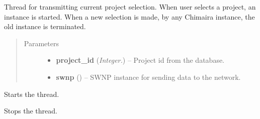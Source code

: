 \documentclass[letterpaper,10pt,english]{sphinxmanual}
\begin{document}

\begin{fulllineitems}
\label{api:wos.CURRENT_PROJECT}
Thread for transmitting current project selection. When user selects a project, an instance is started. When a new selection is made, by any Chimaira instance, the old instance is terminated.
\begin{quote}\begin{description}
\item[{Parameters}] \leavevmode\begin{itemize}
\item {} 
\textbf{project\_id} (\emph{Integer.}) -- Project id from the database.

\item {} 
\textbf{swnp} ({\hyperref[api:swnp.SWNP]{}}) -- SWNP instance for sending data to the network.

\end{itemize}

\end{description}\end{quote}

\begin{fulllineitems}
\label{api:wos.CURRENT_PROJECT.run}
Starts the thread.

\end{fulllineitems}


\begin{fulllineitems}
\label{api:wos.CURRENT_PROJECT.stop}
Stops the thread.

\end{fulllineitems}


\end{fulllineitems}

\end{document}
